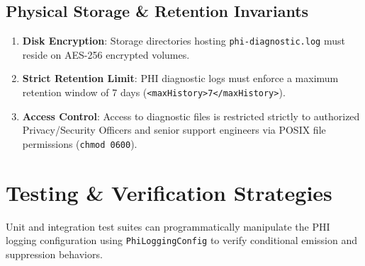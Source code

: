 \subsection{Physical Storage \& Retention Invariants}
\begin{enumerate}
    \item \textbf{Disk Encryption}: Storage directories hosting \texttt{phi-diagnostic.log} must reside on AES-256 encrypted volumes.
    \item \textbf{Strict Retention Limit}: PHI diagnostic logs must enforce a maximum retention window of 7 days (\texttt{<maxHistory>7</maxHistory>}).
    \item \textbf{Access Control}: Access to diagnostic files is restricted strictly to authorized Privacy/Security Officers and senior support engineers via POSIX file permissions (\texttt{chmod 0600}).
\end{enumerate}

\section{Testing \& Verification Strategies}
\label{sec:phi_testing}

Unit and integration test suites can programmatically manipulate the PHI logging configuration using \texttt{PhiLoggingConfig} to verify conditional emission and suppression behaviors.

